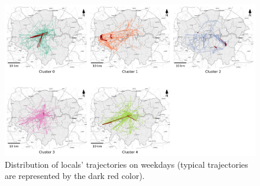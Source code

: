 \documentclass{article}
\theoremstyle{definition}
\theoremstyle{remark}
\begin{document}
\begin{figure}[!h]
\centering
\includegraphics[width=1\textwidth]{figures/traj_distribution_weekday_locals.png}
\caption{\label{fig:traj_distribution_weekday_locals}Distribution of locals' trajectories on weekdays (typical trajectories are represented by the dark red color).}
\end{figure}
\end{document}
